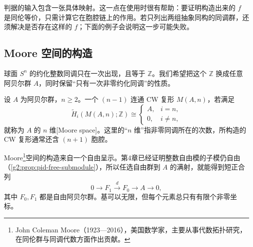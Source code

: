 判据的输入包含一张具体映射。这一点在使用时很有帮助：要证明构造出来的 \(f\) 是同伦等价，只需计算它在胞腔链上的作用。若只列出两组抽象同构的同调群，还须解决是否存在这样的 \(f\)；下面的例子会说明这一步可能失败。

\subsection{Moore 空间的构造}
\label{g2:subsec:0904:02}

球面 \(S^n\) 的约化整数同调只在一次出现，且等于 \(\mathbb Z\)。我们希望把这个 \(\mathbb Z\) 换成任意阿贝尔群 \(A\)，同时保留“只有一次非零约化同调”的性质。

\begin{definition}[Moore 空间]\label{g2:def:moore-space}
	设 \(A\) 为阿贝尔群，\(n\ge2\)。一个 \((n-1)\) 连通 CW 复形 \(M(A,n)\)，若满足
	\[
		\widetilde H_i(M(A,n);\mathbb Z)\cong
		\begin{cases}A,&i=n,\\0,&i\ne n,\end{cases}
	\]
	就称为 \(A\) 的 \(n\) 维[Moore space]。这里的“\(n\) 维”指非零同调所在的次数，所构造的 CW 复形通常还含 \((n+1)\) 胞腔。
\end{definition}

Moore\footnote{John Coleman Moore（1923—2016），美国数学家，主要从事代数拓扑研究，在同伦群与同调代数方面作出贡献。}空间的构造来自一个自由呈示。第4章已经证明整数自由模的子模仍自由（\cref{g2:prop:pid-free-submodule}），所以任选自由群到 \(A\) 的满射，就能得到短正合列
\begin{equation}\label{g2:eq:moore-presentation}
	0\longrightarrow F_1\xrightarrow{d}F_0\longrightarrow A\longrightarrow0,
\end{equation}
其中 \(F_0,F_1\) 都是自由阿贝尔群。基可以无限，但每个元素总只有有限个非零坐标。

